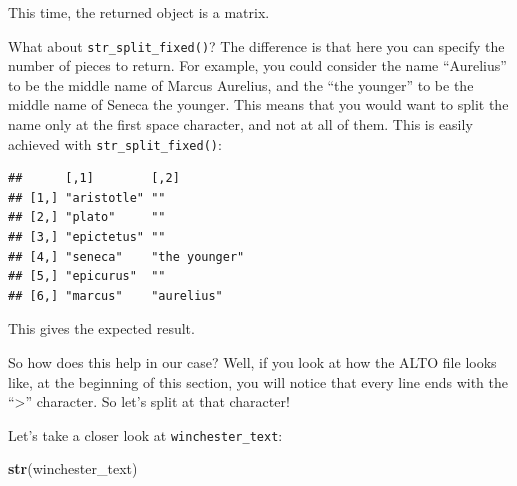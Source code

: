 \documentclass[]{gitbook}
\newenvironment{Shaded}{\begin{snugshade}}{\end{snugshade}}
\newcommand{\DecValTok}[1]{\textcolor[rgb]{0.00,0.00,0.81}{#1}}
\newcommand{\KeywordTok}[1]{\textcolor[rgb]{0.13,0.29,0.53}{\textbf{#1}}}
\newcommand{\NormalTok}[1]{#1}
\newcommand{\OperatorTok}[1]{\textcolor[rgb]{0.81,0.36,0.00}{\textbf{#1}}}
\newcommand{\StringTok}[1]{\textcolor[rgb]{0.31,0.60,0.02}{#1}}
\begin{document}
This time, the returned object is a matrix.

What about \texttt{str\_split\_fixed()}? The difference is that here you can specify the number of pieces
to return. For example, you could consider the name ``Aurelius'' to be the middle name of Marcus Aurelius,
and the ``the younger'' to be the middle name of Seneca the younger. This means that you would want
to split the name only at the first space character, and not at all of them. This is easily achieved
with \texttt{str\_split\_fixed()}:

\begin{Shaded}
\end{Shaded}

\begin{verbatim}
##      [,1]        [,2]         
## [1,] "aristotle" ""           
## [2,] "plato"     ""           
## [3,] "epictetus" ""           
## [4,] "seneca"    "the younger"
## [5,] "epicurus"  ""           
## [6,] "marcus"    "aurelius"
\end{verbatim}

This gives the expected result.

So how does this help in our case? Well, if you look at how the ALTO file looks like, at the beginning
of this section, you will notice that every line ends with the ``\textgreater{}'' character. So let's split at
that character!

\begin{Shaded}
\end{Shaded}

Let's take a closer look at \texttt{winchester\_text}:

\begin{Shaded}
\begin{Highlighting}[]
\KeywordTok{str}\NormalTok{(winchester_text)}
\end{Highlighting}
\end{Shaded}
\end{document}
